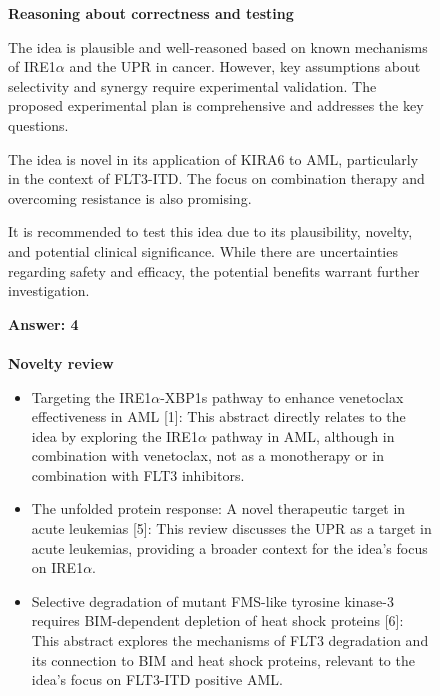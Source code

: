 \begin{figure}[htbp!]
\begin{tcolorbox}[
    colback=black!5!white,
    colframe=black!60!white,
    title=\textbf{KIRA6 for AML (continued)},
    fonttitle=\bfseries,
    arc=3mm,
    boxrule=1pt,
    bottomrule=2pt,
]
\scriptsize

\textbf{Reasoning about correctness and testing}

The idea is plausible and well-reasoned based on known mechanisms of IRE1$\alpha$ and the UPR in cancer. However, key assumptions about selectivity and synergy require experimental validation. The proposed experimental plan is comprehensive and addresses the key questions.

The idea is novel in its application of KIRA6 to AML, particularly in the context of FLT3-ITD. The focus on combination therapy and overcoming resistance is also promising.

It is recommended to test this idea due to its plausibility, novelty, and potential clinical significance. While there are uncertainties regarding safety and efficacy, the potential benefits warrant further investigation.

\textbf{Answer: 4}
\\
\\
\textbf{Novelty review}
\begin{itemize}
    \item Targeting the IRE1$\alpha$-XBP1s pathway to enhance venetoclax effectiveness in AML [1]: This abstract directly relates to the idea by exploring the IRE1$\alpha$ pathway in AML, although in combination with venetoclax, not as a monotherapy or in combination with FLT3 inhibitors.
    \item The unfolded protein response: A novel therapeutic target in acute leukemias [5]: This review discusses the UPR as a target in acute leukemias, providing a broader context for the idea's focus on IRE1$\alpha$.
    \item Selective degradation of mutant FMS-like tyrosine kinase-3 requires BIM-dependent depletion of heat shock proteins [6]: This abstract explores the mechanisms of FLT3 degradation and its connection to BIM and heat shock proteins, relevant to the idea's focus on FLT3-ITD positive AML.
\end{itemize}


\end{tcolorbox}
\end{figure}
